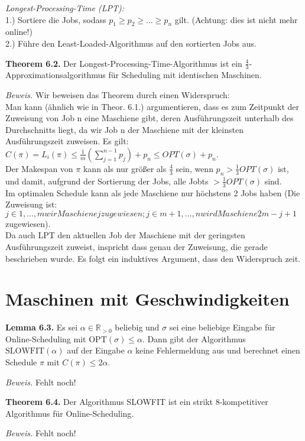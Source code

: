 \textit{Longest-Processing-Time (LPT):} \\
1.) Sortiere die Jobs, sodass $p_{1} \ge p_{2} \ge ... \ge p_{n}$  gilt. (Achtung: dies ist nicht mehr online!)\\
2.) Führe den Least-Loaded-Algorithmus auf den sortierten Jobs aus.

\textbf{Theorem 6.2.} Der Longest-Processing-Time-Algorithmus ist ein $\frac{4}{3}$-Approximationsalgorithmus für Scheduling mit identischen Maschinen.

\textit{Beweis.} Wir beweisen das Theorem durch einen Widerspruch: \\
Man kann (ähnlich wie in Theor. 6.1.) argumentieren, dass es zum Zeitpunkt der Zuweisung von Job n eine Maschiene gibt, deren Ausführungszeit unterhalb des Durchschnitts liegt, da wir Job n der Maschiene mit der kleinsten Ausführungszeit zuweisen. Es gilt: \\
$C(\pi) = L_{i}(\pi) \le \tfrac{1}{m} ( \sum_{j=1}^{n-1} p_{j}) +p_{n} \le OPT(\sigma) + p_{n}$. \\
Der Makespan von $\pi$ kann als nur größer als $\tfrac{4}{3}$ sein, wenn $p_{n} > \tfrac{1}{3} OPT(\sigma)$ ist, und damit, aufgrund der Sortierung der Jobs, alle Jobts $> \tfrac{1}{3} OPT(\sigma)$  sind.\\
Im optimalen Schedule kann als jede Maschiene nur höchstens 2 Jobs haben (Die Zuweisung ist: $j \in {1, ..., m} wir Maschiene j zugewiesen;  j \in {m+1, ..., n} wird Maschiene 2m - j + 1$ zugewiesen).\\ 
Da auch LPT den aktuellen Job der Maschiene mit der geringsten Ausführungszeit zuweist, inspricht dass genau der Zuweisung, die gerade beschrieben wurde. Es folgt ein induktives Argument, dass den Widerspruch zeit.



\section{Maschinen mit Geschwindigkeiten}

\textbf{Lemma 6.3.} Es sei $\alpha \in \mathbb{R}_{>0}$ beliebig und $\sigma$ sei eine beliebige Eingabe für Online-Scheduling mit $\textrm{OPT}(\sigma) \leq \alpha$. Dann gibt der Algorithmus $\textrm{SLOWFIT}(\alpha)$ auf der Eingabe $\alpha$ keine Fehlermeldung aus und berechnet einen Schedule $\pi$ mit $C(\pi) \leq 2 \alpha$.

\textit{Beweis.} Fehlt noch!


\textbf{Theorem 6.4.} Der Algorithmus SLOWFIT ist ein strikt 8-kompetitiver Algorithmus für Online-Scheduling.

\textit{Beweis.} Fehlt noch!
